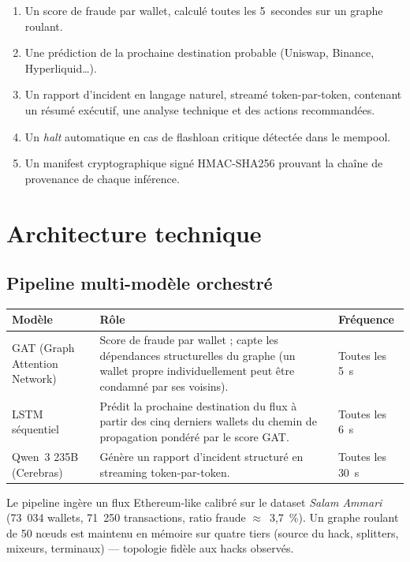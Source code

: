 \documentclass[11pt,a4paper]{article}
\begin{document}
\begin{enumerate}
  \item Un score de fraude par wallet, calculé toutes les 5~secondes
        sur un graphe roulant.
  \item Une prédiction de la prochaine destination probable
        (Uniswap, Binance, Hyperliquid\ldots).
  \item Un rapport d'incident en langage naturel, streamé
        token-par-token, contenant un résumé exécutif, une analyse
        technique et des actions recommandées.
  \item Un \emph{halt} automatique en cas de flashloan critique
        détectée dans le mempool.
  \item Un manifest cryptographique signé HMAC-SHA256 prouvant la
        chaîne de provenance de chaque inférence.
\end{enumerate}

\section{Architecture technique}

\subsection{Pipeline multi-modèle orchestré}

\begin{tabularx}{\linewidth}{@{}lXl@{}}
\toprule
\textbf{Modèle} & \textbf{Rôle} & \textbf{Fréquence} \\
\midrule
GAT (Graph Attention Network) &
Score de fraude par wallet ; capte les dépendances structurelles
du graphe (un wallet propre individuellement peut être condamné par
ses voisins). &
Toutes les 5~s \\
\addlinespace
LSTM séquentiel &
Prédit la prochaine destination du flux à partir des cinq derniers
wallets du chemin de propagation pondéré par le score GAT. &
Toutes les 6~s \\
\addlinespace
Qwen~3 235B (Cerebras) &
Génère un rapport d'incident structuré en streaming token-par-token. &
Toutes les 30~s \\
\bottomrule
\end{tabularx}

\medskip

Le pipeline ingère un flux Ethereum-like calibré sur le dataset
\emph{Salam Ammari} (73~034 wallets, 71~250 transactions, ratio
fraude $\approx$~3,7~\%). Un graphe roulant de 50 nœuds est maintenu
en mémoire sur quatre tiers (source du hack, splitters, mixeurs,
terminaux) --- topologie fidèle aux hacks observés.
\end{document}
